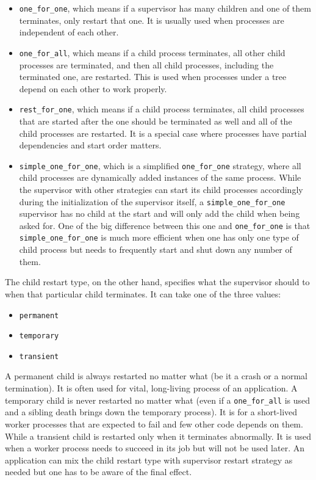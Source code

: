 \begin{itemize}

\item \verb|one_for_one|, which means if a supervisor has many children and one of them terminates, only restart that one. It is usually used when processes are independent of each other.

\item \verb|one_for_all|, which means if a child process terminates, all other child processes are terminated, and then all child processes, including the terminated one, are restarted. This is used when processes under a tree depend on each other to work properly.

\item \verb|rest_for_one|, which means if a child process terminates, all child processes that are started after the one should be terminated as well and all of the child processes are restarted. It is a special case where processes have partial dependencies and start order matters.

\item \verb|simple_one_for_one|, which is a simplified \verb|one_for_one| strategy, where all child processes are dynamically added instances of the same process. While the supervisor with other strategies can start its child processes accordingly during the initialization of the supervisor itself, a \verb|simple_one_for_one| supervisor has no child at the start and will only add the child when being asked for. One of the big difference between this one and \verb|one_for_one| is that \verb|simple_one_for_one| is much more efficient when one has only one type of child process but needs to frequently start and shut down any number of them.

\end{itemize}

The child restart type, on the other hand, specifies what the supervisor should to when that particular child terminates. It can take one of the three values:

\begin{itemize}

\item \verb|permanent|
\item \verb|temporary|
\item \verb|transient|

\end{itemize}

A permanent child is always restarted no matter what (be it a crash or a normal termination). It is often used for vital, long-living process of an application. A temporary child is never restarted no matter what (even if a \verb|one_for_all| is used and a sibling death brings down the temporary process). It is for a short-lived worker processes that are expected to fail and few other code depends on them. While a transient child is restarted only when it terminates abnormally. It is used when a worker process needs to succeed in its job but will not be used later. An application can mix the child restart type with supervisor restart strategy as needed but one has to be aware of the final effect. 

